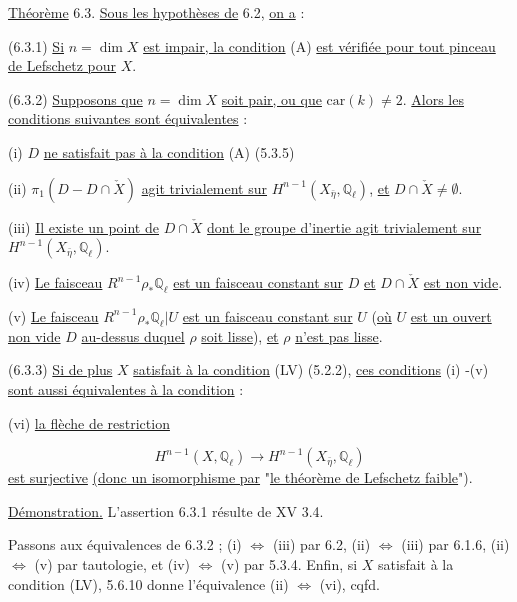 \underline{Théorème} 6.3. \underline{Sous les hypothèses de} 6.2, \underline{on a} :

(6.3.1) \underline{Si} $n = \dim X$ \underline{est impair, la condition} (A) \underline{est vérifiée pour tout pinceau de Lefschetz pour} $X$.

(6.3.2) \underline{Supposons que} $n = \dim X$ \underline{soit pair, ou que} $\mathrm{car}(k) \neq 2$. \underline{Alors les conditions suivantes sont équivalentes} :

(i) $D$ \underline{ne satisfait pas à la condition} (A) (5.3.5)

(ii) $\pi_1(D-D \cap \check{X})$ \underline{agit trivialement sur} $H^{n-1}(X_{\bar{\eta}},\mathbb{Q}_\ell)$, \underline{et} $D \cap \check{X} \neq \emptyset$.

(iii) \underline{Il existe un point de} $D \cap \check{X}$ \underline{dont le groupe d'inertie agit trivialement sur} $H^{n-1}(X_{\bar{\eta}},\mathbb{Q}_\ell)$.

(iv) \underline{Le faisceau} $R^{n-1}\rho_*\mathbb{Q}_\ell$ \underline{est un faisceau constant sur} $D$ \underline{et} $D \cap \check{X}$ \underline{est non vide}.

(v) \underline{Le faisceau} $R^{n-1}\rho_*\mathbb{Q}_\ell|U$ \underline{est un faisceau constant sur} $U$ (\underline{où} $U$ \underline{est un ouvert non vide} $D$ \underline{au-dessus duquel} $\rho$ \underline{soit lisse}), \underline{et} $\rho$ \underline{n'est pas lisse}.



(6.3.3)  \underline{Si de plus} $X$ \underline{satisfait à la condition} (LV) (5.2.2), \underline{ces conditions} (i) -(v) \underline{sont aussi équivalentes à la condition} :

(vi)  \underline{la flèche de restriction}

\begin{equation*}
H^{n-1}(X,\mathbb{Q}_\ell) \longrightarrow H^{n-1}(X_{\bar{\eta}},\mathbb{Q}_\ell)
\end{equation*}
\underline{est surjective} \underline{(donc un isomorphisme par} "\underline{le théorème de Lefschetz faible}").

\underline{Démonstration.}  L'assertion 6.3.1  résulte de XV 3.4.

Passons aux équivalences de 6.3.2 ; (i) $\Longleftrightarrow$ (iii) par 6.2, (ii) $\Longleftrightarrow$ (iii) par 6.1.6, (ii) $\Longleftrightarrow$ (v) par tautologie, et (iv) $\Longleftrightarrow$ (v) par 5.3.4. Enfin, si $X$ satisfait à la condition (LV), 5.6.10 donne l'équivalence (ii) $\Longleftrightarrow$ (vi), cqfd.

